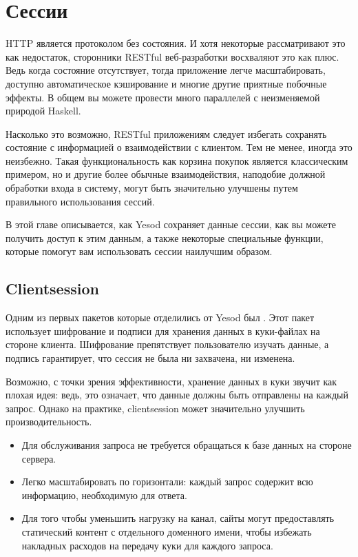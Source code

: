 \chapter{Сессии}\label{chap:sessions}

HTTP является протоколом без состояния. И хотя некоторые рассматривают это как недостаток, сторонники RESTful веб-разработки восхваляют это как плюс. Ведь когда состояние отсутствует, тогда приложение легче масштабировать, доступно автоматическое кэширование и многие другие приятные побочные эффекты. В общем вы можете провести много параллелей с неизменяемой природой Haskell.

Насколько это возможно, RESTful приложениям следует избегать сохранять состояние с информацией о взаимодействии с клиентом. Тем не менее, иногда это неизбежно. Такая функциональность как корзина покупок является классическим примером, но и другие более обычные взаимодействия, наподобие должной обработки входа в систему, могут быть значительно улучшены путем правильного использования сессий.

В этой главе описывается, как Yesod сохраняет данные сессии, как вы можете получить доступ к этим данным, а также некоторые специальные функции, которые помогут вам использовать сессии наилучшим образом.

\section{Clientsession}

Одним из первых пакетов которые отделились от Yesod был . Этот пакет использует шифрование и подписи для хранения данных в куки-файлах на стороне клиента. Шифрование препятствует пользователю изучать данные, а подпись гарантирует, что сессия не была ни захвачена, ни изменена.

Возможно, с точки зрения эффективности, хранение данных в куки звучит как плохая идея: ведь, это означает, что данные должны быть отправлены на каждый запрос. Однако на практике, clientsession может значительно улучшить производительность.

\begin{itemize}
  \item Для обслуживания запроса не требуется обращаться к базе данных на стороне сервера.
  \item Легко масштабировать по горизонтали: каждый запрос содержит всю информацию, необходимую для ответа.
  \item Для того чтобы уменьшить нагрузку на канал, сайты могут предоставлять статический контент с отдельного доменного имени, чтобы избежать накладных расходов на передачу куки для каждого запроса.
\end{itemize}

